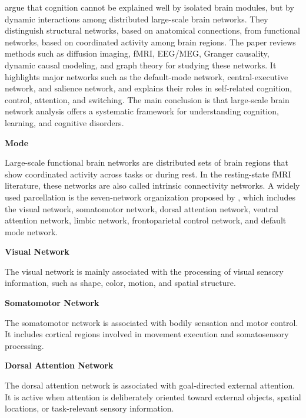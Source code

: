\documentclass{book}
\providecommand{\ProjectDeepHeading}[2]{%
    \par\medskip\noindent\textbf{#2}\par\smallskip
}
\begin{document}
    \cite{bressler-2010-large-scale-brain-networks-in-cognition-emerging-methods-and-principles} argue that cognition cannot be explained well by isolated brain modules, but by dynamic interactions among distributed large-scale brain networks. They distinguish structural networks, based on anatomical connections, from functional networks, based on coordinated activity among brain regions. The paper reviews methods such as diffusion imaging, fMRI, EEG/MEG, Granger causality, dynamic causal modeling, and graph theory for studying these networks. It highlights major networks such as the default-mode network, central-executive network, and salience network, and explains their roles in self-related cognition, control, attention, and switching. The main conclusion is that large-scale brain network analysis offers a systematic framework for understanding cognition, learning, and cognitive disorders.

\ProjectDeepHeading{7}{Mode}


Large-scale functional brain networks are distributed sets of brain regions that show coordinated activity across tasks or during rest. In the resting-state fMRI literature, these networks are also called intrinsic connectivity networks. A widely used parcellation is the seven-network organization proposed by \citet{yeo-2011-the-organization-of-the-human-cerebral-cortex}, which includes the visual network, somatomotor network, dorsal attention network, ventral attention network, limbic network, frontoparietal control network, and default mode network.
    
    
    \ProjectDeepHeading{10}{Visual Network}
        
        The visual network is mainly associated with the processing of visual sensory information, such as shape, color, motion, and spatial structure.
    
    
    \ProjectDeepHeading{10}{Somatomotor Network}
        
        The somatomotor network is associated with bodily sensation and motor control. It includes cortical regions involved in movement execution and somatosensory processing.
    
    
    \ProjectDeepHeading{10}{Dorsal Attention Network}
        
        The dorsal attention network is associated with goal-directed external attention. It is active when attention is deliberately oriented toward external objects, spatial locations, or task-relevant sensory information.
    
\end{document}
